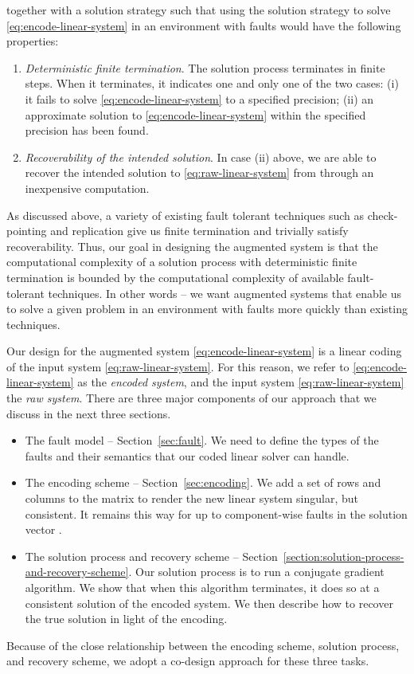\documentclass[11pt]{article}
\begin{document}
together with a solution strategy such that using the solution strategy to solve
\eqref{eq:encode-linear-system} in an environment with faults would have the following
properties:
\begin{enumerate}[1.]
\item \textit{Deterministic finite termination}. The solution process terminates in
finite steps. When it terminates, it indicates one and only one of the two cases:
(i) it fails to solve \eqref{eq:encode-linear-system} to a specified precision;
(ii) an approximate solution  to \eqref{eq:encode-linear-system} within the
specified precision has been found.
\item \textit{Recoverability of the intended solution}. In case (ii) above, we
are able to recover the intended solution  to \eqref{eq:raw-linear-system}
from  through an inexpensive computation.
\end{enumerate}
As discussed above, a variety of existing fault tolerant techniques such as
check-pointing and replication give us finite termination and trivially satisfy
recoverability. Thus, our goal in designing the augmented system is that the
computational complexity of a solution process with deterministic finite termination
is bounded by the computational complexity of available fault-tolerant techniques.
In other words -- we want augmented systems that enable us to solve a given problem in
an environment with faults more quickly than existing techniques.

Our design for the augmented system \eqref{eq:encode-linear-system} is a linear
coding of the input system \eqref{eq:raw-linear-system}. For this reason, we refer
to \eqref{eq:encode-linear-system} as the \textit{encoded system}, and the input
system \eqref{eq:raw-linear-system} the \textit{raw system}. There are three major
components of our approach that we discuss in the next three sections. 
\begin{itemize}
\item The fault model -- Section~\ref{sec:fault}. We need to define the types of the
faults and their semantics that our coded linear solver can handle.
\item The encoding scheme -- Section~\ref{sec:encoding}. We add a set of rows
and columns to the matrix to render the new linear system singular, but consistent.
It remains this way for up to  component-wise faults in the solution vector .
\item The solution process and recovery scheme --
Section~\ref{section:solution-process-and-recovery-scheme}. Our solution process
is to run a conjugate gradient algorithm. We show that when this algorithm terminates,
it does so at a consistent solution of the encoded system. We then describe how to
recover the true solution  in light of the encoding.
\end{itemize}
Because of the close relationship between the encoding scheme, solution process, and
recovery scheme, we adopt a co-design approach for these three tasks. 
\end{document}
